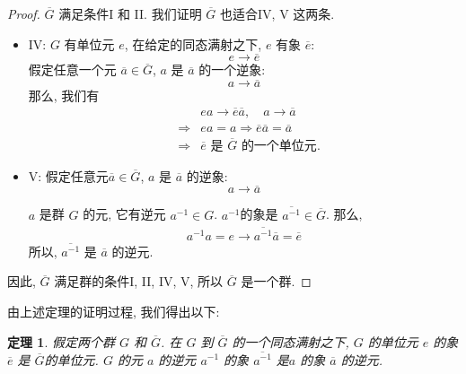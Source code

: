 \documentclass[utf8]{ctexbook}
\newtheorem{theorem}{定理}[section]
\begin{document}
\begin{proof}

$\overline{G}$ 满足条件I 和 II. 我们证明 $\overline{G}$ 也适合IV, V 这两条.

\begin{itemize}
\item{IV: $G$ 有单位元 $e$, 在给定的同态满射之下, $e$ 有象 $\overline{e}$:
\begin{equation}
e \longrightarrow \overline{e}
\end{equation}
假定任意一个元 $\overline{a} \in \overline{G}$, $a$ 是 $\overline{a}$ 的一个逆象:
\begin{equation}
a \longrightarrow \overline{a}
\end{equation}
那么, 我们有
\begin{eqnarray}
& & ea \longrightarrow \overline{e} \overline{a}, \quad a \longrightarrow \overline{a} \\
&\Rightarrow & ea = a \Rightarrow \overline{e}\overline{a} = \overline{a} \\
&\Rightarrow & \mbox{$\overline{e}$ 是 $\overline{G}$ 的一个单位元}.
\end{eqnarray}

}

\item{V: 假定任意元$\overline{a} \in \overline{G}$, $a$ 是 $\overline{a}$ 的逆象:
\begin{equation}
a \longrightarrow \overline{a}
\end{equation}

$a$ 是群 $G$ 的元, 它有逆元 $a^{-1} \in G$. $a^{-1}$的象是 $\overline{a^{-1}} \in \overline{G}$. 那么,
\begin{eqnarray}
a^{-1} a = e \longrightarrow \overline{a^{-1}} \overline{a} = \overline{e} 
\end{eqnarray}
所以, $\overline{a^{-1}}$ 是 $\overline{a}$ 的逆元.
}
\end{itemize}

因此, $\overline{G}$ 满足群的条件I, II, IV, V, 所以 $\overline{G}$ 是一个群.

\end{proof}

由上述定理的证明过程, 我们得出以下:

\begin{theorem}
假定两个群 $G$ 和 $\overline{G}$. 在 $G$ 到 $\overline{G}$ 的一个同态满射之下, $G$ 的单位元 $e$ 的象 $\overline{e}$ 是 $\overline{G}$的单位元. $G$ 的元 $a$ 的逆元 $a^{-1}$ 的象 $\overline{a^{-1}}$ 是$a$ 的象 $\overline{a}$ 的逆元.

\end{theorem}
\end{document}
